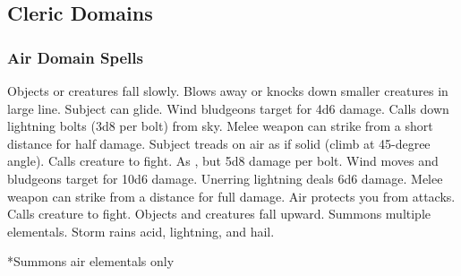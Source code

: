 \subsection{Cleric Domains}\label{Cleric Domains}

\begin{comment}
\subsubsection{Example Domain}
\parhead{Domain Power}
\parhead{Channelled Domain Power}
\parhead{Greater Domain Power}
\parhead{Greater Channelled Domain Power}
\parhead{Domain Mastery}
\begin{spelllist}
  \spellhead[1]{}
  \spellhead[1]{}
  \spellhead[2]{}
  \spellhead[2]{}
  \spellhead[3]{}
  \spellhead[3]{}
  \spellhead[4]{}
  \spellhead[4]{}
  \spellhead[5]{}
  \spellhead[5]{}
  \spellhead[6]{}
  \spellhead[6]{}
  \spellhead[7]{}
  \spellhead[7]{}
  \spellhead[8]{}
  \spellhead[8]{}
  \spellhead[9]{}
  \spellhead[9]{}
\end{spelllist}
\end{comment}

\subsubsection{Air Domain Spells}

\begin{spelllist}
   Objects or creatures fall slowly.
   Blows away or knocks down smaller creatures in large line.
   Subject can glide.
   Wind bludgeons target for 4d6 damage.
   Calls down lightning bolts (3d8 per bolt) from sky.
   Melee weapon can strike from a short distance for half damage.
   Subject treads on air as if solid (climb at 45-degree angle).
   Calls creature to fight.
   As , but 5d8 damage per bolt.
   Wind moves and bludgeons target for 10d6 damage.
   Unerring lightning deals 6d6 damage.
   Melee weapon can strike from a distance for full damage.
   Air protects you from attacks. 
   Calls creature to fight.
   Objects and creatures fall upward.
   Summons multiple elementals.
   Storm rains acid, lightning, and hail.
\end{spelllist}
*Summons air elementals only

